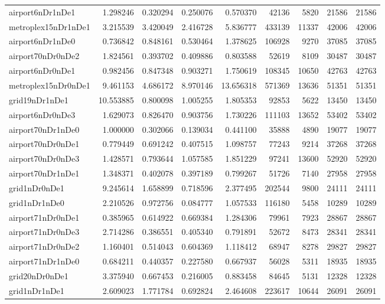 \begin{longtable}{|l|r|r|r|r|r|r|r|r|}
airport6nDr1nDe1 & 1.298246 & 0.320294 & 0.250076 & 0.570370 & 42136 & 5820 & 21586 & 21586 \\
metroplex15nDr1nDe1 & 3.215539 & 3.420049 & 2.416728 & 5.836777 & 433139 & 11337 & 42006 & 42006 \\
airport6nDr1nDe0 & 0.736842 & 0.848161 & 0.530464 & 1.378625 & 106928 & 9270 & 37085 & 37085 \\
airport70nDr0nDe2 & 1.824561 & 0.393702 & 0.409886 & 0.803588 & 52619 & 8109 & 30487 & 30487 \\
airport6nDr0nDe1 & 0.982456 & 0.847348 & 0.903271 & 1.750619 & 108345 & 10650 & 42763 & 42763 \\
metroplex15nDr0nDe1 & 9.461153 & 4.686172 & 8.970146 & 13.656318 & 571369 & 13636 & 51351 & 51351 \\
grid19nDr1nDe1 & 10.553885 & 0.800098 & 1.005255 & 1.805353 & 92853 & 5622 & 13450 & 13450 \\
airport6nDr0nDe3 & 1.629073 & 0.826470 & 0.903756 & 1.730226 & 111103 & 13652 & 53402 & 53402 \\
airport70nDr1nDe0 & 1.000000 & 0.302066 & 0.139034 & 0.441100 & 35888 & 4890 & 19077 & 19077 \\
airport70nDr0nDe1 & 0.779449 & 0.691242 & 0.407515 & 1.098757 & 77243 & 9214 & 37268 & 37268 \\
airport70nDr0nDe3 & 1.428571 & 0.793644 & 1.057585 & 1.851229 & 97241 & 13600 & 52920 & 52920 \\
airport70nDr1nDe1 & 1.348371 & 0.402078 & 0.397189 & 0.799267 & 51726 & 7140 & 27958 & 27958 \\
grid1nDr0nDe1 & 9.245614 & 1.658899 & 0.718596 & 2.377495 & 202544 & 9800 & 24111 & 24111 \\
grid1nDr1nDe0 & 2.210526 & 0.972756 & 0.084777 & 1.057533 & 116180 & 5458 & 10289 & 10289 \\
airport71nDr0nDe1 & 0.385965 & 0.614922 & 0.669384 & 1.284306 & 79961 & 7923 & 28867 & 28867 \\
airport71nDr0nDe3 & 2.714286 & 0.386551 & 0.405340 & 0.791891 & 52672 & 8473 & 28341 & 28341 \\
airport71nDr0nDe2 & 1.160401 & 0.514043 & 0.604369 & 1.118412 & 68947 & 8278 & 29827 & 29827 \\
airport71nDr1nDe0 & 0.684211 & 0.440357 & 0.227580 & 0.667937 & 56028 & 5311 & 18935 & 18935 \\
grid20nDr0nDe1 & 3.375940 & 0.667453 & 0.216005 & 0.883458 & 84645 & 5131 & 12328 & 12328 \\
grid1nDr1nDe1 & 2.609023 & 1.771784 & 0.692824 & 2.464608 & 223617 & 10644 & 26091 & 26091 \\

\end{longtable}
